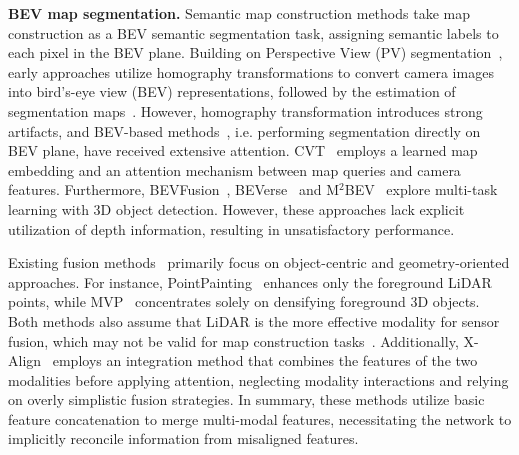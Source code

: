 \textbf{BEV map segmentation.}
Semantic map construction methods \cite{roddick2020predicting,pan2020cross,gosala2022bird,liu2023bevfusion} take map construction as a BEV semantic segmentation task, assigning semantic labels to each pixel in the BEV plane.
Building on Perspective View (PV) segmentation~\cite{roddick2018orthographic,202eecvlls}, early approaches utilize homography transformations to convert camera images into bird's-eye view (BEV) representations, followed by the estimation of segmentation maps~\cite{ammar2019geometric,zhang2022beverse,garnett20193d,zhu2021monocular}.
However, homography transformation introduces strong artifacts, and BEV-based methods~\cite{zhou2022cross, xie2022m,liu2023bevfusion}, i.e. performing segmentation directly on BEV plane, have received extensive attention.
CVT~\cite{zhou2022cross} employs a learned map embedding and an attention mechanism between map queries and camera features.
Furthermore, BEVFusion~\cite{liu2023bevfusion}, BEVerse~\cite{zhang2022beverse} and M$^{2}$BEV~\cite{xie2022m} explore
multi-task learning with 3D object detection.
However, these approaches lack explicit utilization of depth information, resulting in unsatisfactory performance.


Existing fusion methods~\cite{2020cvprpointpainting,21nipsmultimodal} primarily focus on object-centric and geometry-oriented approaches. For instance, PointPainting~\cite{2020cvprpointpainting} enhances only the foreground LiDAR points, while MVP~\cite{21nipsmultimodal} concentrates solely on densifying foreground 3D objects. 
Both methods also assume that LiDAR is the more effective modality for sensor fusion, which may not be valid for map construction tasks~\cite{liu2023bevfusion}.
Additionally, X-Align~\cite{borse2023x} employs an integration method that combines the features of the two modalities before applying attention, neglecting modality interactions and relying on overly simplistic fusion strategies.
In summary, these methods utilize basic feature concatenation to merge multi-modal features, necessitating the network to implicitly reconcile information from misaligned features.






